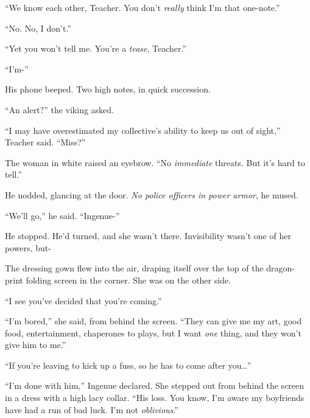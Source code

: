 ``We know each other, Teacher.  You don't \emph{really} think I'm that one-note.''



``No.  No, I don't.''



``Yet you won't tell me.  You're a \emph{tease}, Teacher.''



``I'm-''



His phone beeped.  Two high notes, in quick succession.



``An alert?'' the viking asked.



``I may have overestimated my collective's ability to keep us out of sight,'' Teacher said.  ``Miss?''



The woman in white raised an eyebrow.  ``No \emph{immediate} threats.  But it's hard to tell.''



He nodded, glancing at the door.  \emph{No police officers in power armor}, he mused.



``We'll go,'' he said.  ``Ingenue-''



He stopped.  He'd turned, and she wasn't there.  Invisibility wasn't one of her powers, but-



The dressing gown flew into the air, draping itself over the top of the dragon-print folding screen in the corner.  She was on the other side.



``I see you've decided that you're coming.''



``I'm bored,'' she said, from behind the screen.  ``They can give me my art, good food, entertainment, chaperones to plays, but I want \emph{one} thing, and they won't give him to me.''



``If you're leaving to kick up a fuss, so he has to come after you\ldots''



``I'm done with him,'' Ingenue declared.  She stepped out from behind the screen in a dress with a high lacy collar.  ``His loss.  You know, I'm aware my boyfriends have had a run of bad luck.  I'm not \emph{oblivious}.''



